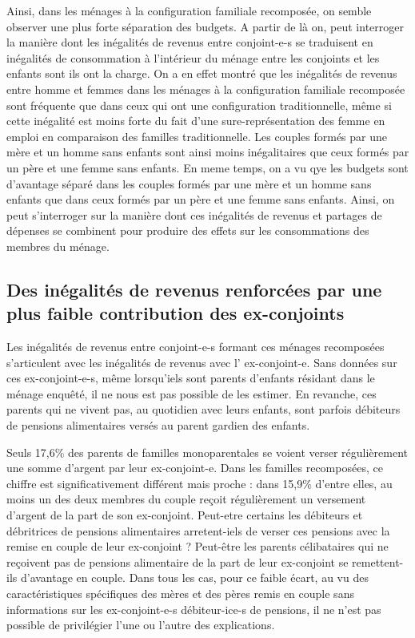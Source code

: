 \documentclass[
  12pt,
]{book}
\begin{document}
Ainsi, dans les ménages à la configuration familiale recomposée, on
semble observer une plus forte séparation des budgets. A partir de là
on, peut interroger la manière dont les inégalités de revenus entre
conjoint-e-s se traduisent en inégalités de consommation à l'intérieur
du ménage entre les conjoints et les enfants sont ils ont la charge. On
a en effet montré que les inégalités de revenus entre homme et femmes
dans les ménages à la configuration familiale recomposée sont fréquente
que dans ceux qui ont une configuration traditionnelle, même si cette
inégalité est moins forte du fait d'une sure-représentation des femme en
emploi en comparaison des familles traditionnelle. Les couples formés
par une mère et un homme sans enfants sont ainsi moins inégalitaires que
ceux formés par un père et une femme sans enfants. En meme temps, on a
vu qye les budgets sont d'avantage séparé dans les couples formés par
une mère et un homme sans enfants que dans ceux formés par un père et
une femme sans enfants. Ainsi, on peut s'interroger sur la manière dont
ces inégalités de revenus et partages de dépenses se combinent pour
produire des effets sur les consommations des membres du ménage.

\subsection{Des inégalités de revenus renforcées par une plus faible
contribution des
ex-conjoints}\label{des-inuxe9galituxe9s-de-revenus-renforcuxe9es-par-une-plus-faible-contribution-des-ex-conjoints}

Les inégalités de revenus entre conjoint-e-s formant ces ménages
recomposées s'articulent avec les inégalités de revenus avec l'
ex-conjoint-e. Sans données sur ces ex-conjoint-e-s, même lorsqu'iels
sont parents d'enfants résidant dans le ménage enquêté, il ne nous est
pas possible de les estimer. En revanche, ces parents qui ne vivent pas,
au quotidien avec leurs enfants, sont parfois débiteurs de pensions
alimentaires versés au parent gardien des enfants.

Seuls 17,6\% des parents de familles monoparentales se voient verser
régulièrement une somme d'argent par leur ex-conjoint-e. Dans les
familles recomposées, ce chiffre est significativement différent mais
proche : dans 15,9\% d'entre elles, au moins un des deux membres du
couple reçoit régulièrement un versement d'argent de la part de son
ex-conjoint. Peut-etre certains les débiteurs et débritrices de pensions
alimentaires arretent-iels de verser ces pensions avec la remise en
couple de leur ex-conjoint ? Peut-être les parents célibataires qui ne
reçoivent pas de pensions alimentaire de la part de leur ex-conjoint se
remettent-ils d'avantage en couple. Dans tous les cas, pour ce faible
écart, au vu des caractéristiques spécifiques des mères et des pères
remis en couple sans informations sur les ex-conjoint-e-s débiteur-ice-s
de pensions, il ne n'est pas possible de privilégier l'une ou l'autre
des explications.
\end{document}

